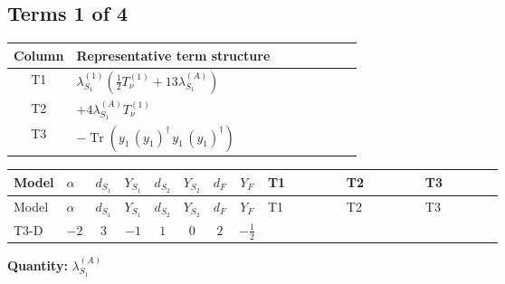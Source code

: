 \documentclass[8pt]{article}
\begin{document}
\begin{landscape}
\subsection*{Terms 1 of 4}
\begin{center}
\begin{tabular}{@{}c >{\raggedright\arraybackslash}p{0.82\linewidth}@{}}
\toprule
Column & Representative term structure \\
\midrule
T1 & \(\displaystyle {\lambda_{S_1}^{(1)}} \left(\frac{1}{2} T_{\nu}^{(1)}+13 {\lambda_{S_1}^{(A)}}\right)\) \\
\midrule
T2 & \(\displaystyle +4 {\lambda_{S_1}^{(A)}} T_{\nu}^{(1)}\) \\
\midrule
T3 & \(\displaystyle -\operatorname{Tr}\!\left({y_1}\,\left({y_1}\right)^{\dagger}\,{y_1}\,\left({y_1}\right)^{\dagger}\right)\) \\
\midrule
\bottomrule
\end{tabular}
\end{center}
\smallskip
\tiny
\begin{longtable}{@{}llcccccc >{\raggedright\arraybackslash}p{0.21\linewidth} >{\raggedright\arraybackslash}p{0.21\linewidth} >{\raggedright\arraybackslash}p{0.21\linewidth}@{}}
\toprule
Model & $\alpha$ & $d_{S_1}$ & $Y_{S_1}$ & $d_{S_2}$ & $Y_{S_2}$ & $d_F$ & $Y_F$ & T1 & T2 & T3 \\
\midrule
\endfirsthead
\toprule
Model & $\alpha$ & $d_{S_1}$ & $Y_{S_1}$ & $d_{S_2}$ & $Y_{S_2}$ & $d_F$ & $Y_F$ & T1 & T2 & T3 \\
\midrule
\endhead
T3-D & $-2$ & $3$ & $-1$ & $1$ & $0$ & $2$ & $-\frac{1}{2}$ & \scriptsize\adjustbox{max width=\linewidth}{$\begin{gathered} {\lambda_{S_1}^{(1)}} \left(\frac{1}{2} T_{\nu}^{(1)}+13 {\lambda_{S_1}^{(A)}}\right)\end{gathered}$} & \scriptsize\adjustbox{max width=\linewidth}{$\begin{gathered} +4 {\lambda_{S_1}^{(A)}} T_{\nu}^{(1)}\end{gathered}$} & \scriptsize\adjustbox{max width=\linewidth}{$\begin{gathered} -\operatorname{Tr}\!\left({y_1}\,\left({y_1}\right)^{\dagger}\,{y_1}\,\left({y_1}\right)^{\dagger}\right)\end{gathered}$} \\
\midrule
\bottomrule
\end{longtable}
\clearpage
\noindent\textbf{Quantity: }$\lambda_{S_1}^{(A)}$\par\smallskip

\end{landscape}
\end{document}
